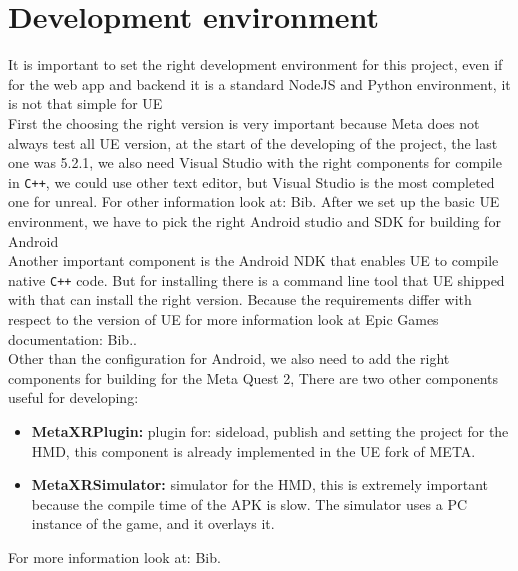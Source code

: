 \section{Development environment}
\noindent
It is important to set the right development environment for this project, even if for the web app and backend it is a standard NodeJS and Python environment, 
it is not that simple for \ac{UE}\\
First the choosing the right version is very important because Meta does not always test all \ac{UE} version, at the start of the developing of the project, the last one was 5.2.1,
we also need Visual Studio with the right components for compile in \texttt{C++}, we could use other text editor, but Visual Studio is the most completed one for unreal.
For other information look at: Bib.\cite{UEvisualStudio}
After we set up the basic \ac{UE} environment, we have to pick the right Android studio and \ac{SDK} for building for Android \\
Another important component is the Android \ac{NDK} that enables \ac{UE} to compile native \texttt{C++} code.
But for installing there is a command line tool that \ac{UE} shipped with that can install the right version. 
Because the requirements differ with respect to the version of \ac{UE} for more information look at Epic Games documentation: Bib.\cite{UEandroid}.\\
Other than the configuration for Android, we also need to add the right components for building for the Meta Quest 2,
There are two other components useful for developing:
\begin{itemize}
  \item \textbf{MetaXRPlugin:} plugin for: sideload, publish and setting the project for the \ac{HMD}, this component is already implemented in the \ac{UE} fork of META.
  \item \textbf{MetaXRSimulator:} simulator for the \ac{HMD}, this is extremely important because the compile time of the \ac{APK} is slow. The simulator uses a PC instance of the game, and it overlays it.
\end{itemize}
\noindent
For more information look at: Bib.\cite{MetaSetup}

